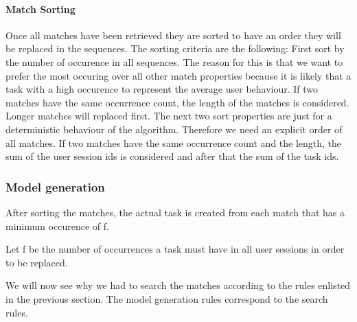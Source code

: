 \paragraph{Match Sorting}
Once all matches have been retrieved they are sorted to have an order they will be replaced in the sequences. The sorting criteria are the following: 
First sort by the number of occurence in all sequences.
The reason for this is that we want to prefer the most occuring over all other match properties because it is likely that a task with a high occurence to represent
the average user behaviour. If two matches have the same occurrence count, the length of the matches is considered. Longer matches will replaced first.
The next two sort properties are just for a deterministic behaviour of the algorithm. 
Therefore we need an explicit order of all matches. 
If two matches have the same  occurrence count and the length, the sum of the user session ids is considered and after that the sum of the task ids.


\subsubsection{Model generation}
After sorting the matches, the actual task is created from each match that has a minimum occurence of f.
\begin{definition}
	\item Let f be the number of occurrences a task must have in all user sessions in order to be replaced.
\end{definition}
We will now see why we had to search the matches according to the rules enlisted in the previous section. The model generation rules correspond to the search rules.

